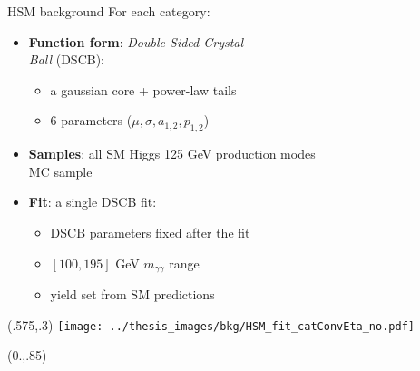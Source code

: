 \documentclass[10pt,UKenglish, leqno, xcolor = dvipsnames]{beamer}
\begin{document}
	\begin{frame}{HSM background}
		\vfill
		For each category:
		\begin{itemize}
			\item \textbf{Function form}: \textit{Double-Sided Crystal\\ Ball} (DSCB):
			\begin{itemize}
				\item a gaussian core + power-law tails
				\item 6 parameters ($\mu, \sigma, a_{1,2}, p_{1,2}$)
			\end{itemize}
			\item \textbf{Samples}: all SM Higgs 125 GeV production modes\\ MC sample
			\item \textbf{Fit}: a single DSCB fit:
			\begin{itemize}
				\item DSCB parameters fixed after the fit
				\item $[100,195]$ GeV $m_{\gamma\gamma}$ range
				\item yield set from SM predictions
			\end{itemize}
		\end{itemize}
		\vspace{.75cm}
		\vfill
		\begin{textblock}{1}(.575,.3)
			\texttt{[image: ../thesis\_images/bkg/HSM\_fit\_catConvEta\_no.pdf]}\\	
		\end{textblock}
		\begin{textblock}{1}(0.,.85)
			\begin{figure}
			\end{figure}
		\end{textblock}
	\end{frame}
\end{document}
